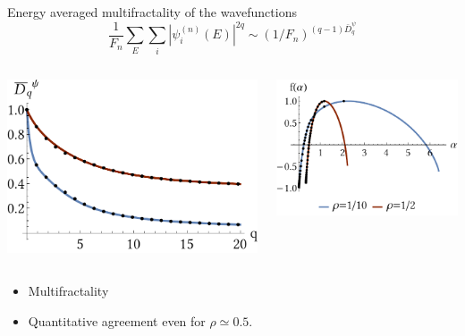 \documentclass[xcolor=x11names,compress,professionalfonts]{beamer}
\renewcommand{\(}{\begin{columns}}
\renewcommand{\)}{\end{columns}}
\newcommand{\<}[1]{\begin{column}{#1}}
\renewcommand{\>}{\end{column}}
\begin{document}
\begin{frame}{Energy averaged multifractality of the wavefunctions}
\[ 
	\frac{1}{F_n} \sum_E \sum_i |\psi_i^{(n)}(E)|^{2q}  \sim (1/F_n)^{(q-1)\bar{D}_q^\psi}
\]
\begin{columns}
	\begin{column}{5cm}
		\centering
		\includegraphics[scale=.4]{dq_av.pdf}
	\end{column}
	\begin{column}{5cm}
		\centering
		\includegraphics[scale=.6]{falpha_av.pdf}
	\end{column}
\end{columns}
		\begin{itemize}
			\item Multifractality
			\item Quantitative agreement even for $\rho \simeq 0.5$.
		\end{itemize}

\end{frame}
\end{document}
